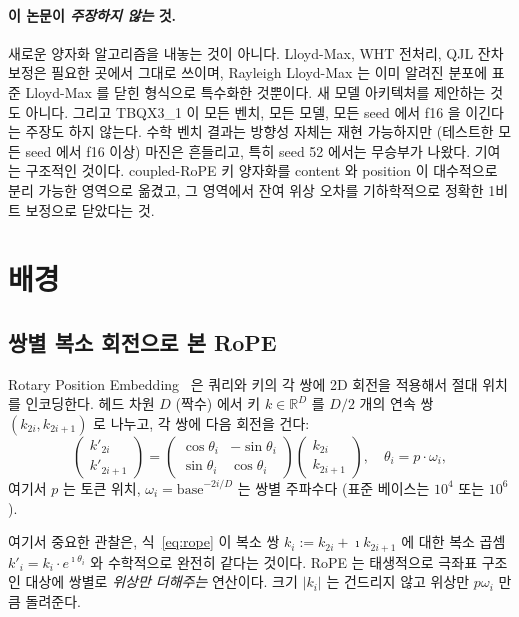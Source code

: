 \documentclass[10pt,twocolumn]{article}
\begin{document}
\paragraph{이 논문이 \emph{주장하지 않는} 것.}
새로운 양자화 알고리즘을 내놓는 것이 아니다. Lloyd-Max, WHT 전처리, QJL 잔차 보정은 필요한 곳에서 그대로 쓰이며, Rayleigh Lloyd-Max 는 이미 알려진 분포에 표준 Lloyd-Max 를 닫힌 형식으로 특수화한 것뿐이다. 새 모델 아키텍처를 제안하는 것도 아니다. 그리고 TBQX3\_1 이 모든 벤치, 모든 모델, 모든 seed 에서 f16 을 이긴다는 주장도 하지 않는다. 수학 벤치 결과는 방향성 자체는 재현 가능하지만 (테스트한 모든 seed 에서 f16 이상) 마진은 흔들리고, 특히 seed 52 에서는 무승부가 나왔다. 기여는 구조적인 것이다. coupled-RoPE 키 양자화를 content 와 position 이 대수적으로 분리 가능한 영역으로 옮겼고, 그 영역에서 잔여 위상 오차를 기하학적으로 정확한 1비트 보정으로 닫았다는 것.

\section{배경}
\label{sec:background}

\subsection{쌍별 복소 회전으로 본 RoPE}
\label{sec:rope-bg}

Rotary Position Embedding~\cite{rope2021} 은 쿼리와 키의 각 쌍에 2D 회전을 적용해서 절대 위치를 인코딩한다. 헤드 차원 $D$ (짝수) 에서 키 $k\in\mathbb{R}^D$ 를 $D/2$ 개의 연속 쌍 $(k_{2i},k_{2i+1})$ 로 나누고, 각 쌍에 다음 회전을 건다:
\begin{equation}
  \begin{pmatrix} k'_{2i}\\k'_{2i+1}\end{pmatrix}
  =
  \begin{pmatrix} \cos\theta_i & -\sin\theta_i\\ \sin\theta_i & \cos\theta_i\end{pmatrix}
  \begin{pmatrix} k_{2i}\\k_{2i+1}\end{pmatrix},\quad
  \theta_i=p\cdot\omega_i,
  \label{eq:rope}
\end{equation}
여기서 $p$ 는 토큰 위치, $\omega_i=\text{base}^{-2i/D}$ 는 쌍별 주파수다 (표준 베이스는 $10^4$ 또는 $10^6$).

여기서 중요한 관찰은, 식~\eqref{eq:rope} 이 복소 쌍 $k_i\!:=\!k_{2i}+\imath k_{2i+1}$ 에 대한 복소 곱셈 $k'_i = k_i\cdot e^{\imath\theta_i}$ 와 수학적으로 완전히 같다는 것이다. RoPE 는 태생적으로 극좌표 구조인 대상에 쌍별로 \emph{위상만 더해주는} 연산이다. 크기 $|k_i|$ 는 건드리지 않고 위상만 $p\omega_i$ 만큼 돌려준다.
\end{document}
